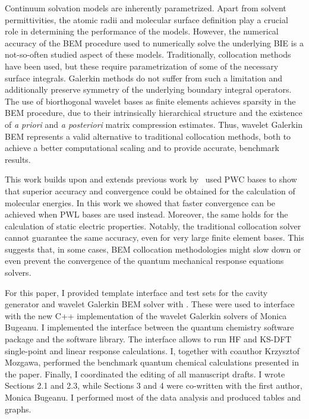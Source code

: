 Continuum solvation models are inherently parametrized. Apart from solvent permittivities,
the atomic radii and molecular surface definition play a crucial role
in determining the performance of the models.
However, the numerical accuracy of the \acs{BEM} procedure used to numerically solve the
underlying \acs{BIE} is a not-so-often studied aspect of these models.
Traditionally, collocation methods have been used, but these require parametrization of some of the necessary surface integrals.
Galerkin methods do not suffer from such a limitation and additionally preserve symmetry of the underlying
boundary integral operators.
The use of biorthogonal wavelet bases as finite elements achieves sparsity in
the \acs{BEM} procedure, due to their intrinsically hierarchical structure and
the existence of \emph{a priori} and \emph{a posteriori} matrix compression
estimates.
Thus, wavelet Galerkin \acs{BEM} represents a valid alternative to traditional collocation methods,
both to achieve a better computational scaling and to provide accurate, benchmark results.

This work builds upon and extends previous work by~\citeauthor{Weijo2010-hy}
\citeauthor{Weijo2010-hy} used \ac{PWC} bases to show that superior accuracy
and convergence could be obtained for the calculation of molecular energies.
In this work we showed that faster convergence can be achieved when \ac{PWL} bases are used instead.
Moreover, the same holds for the calculation of static electric properties.
Notably, the traditional collocation solver cannot guarantee the same accuracy,
even for very large finite element bases. This suggests that, in some cases,
\acs{BEM} collocation methodologies might slow down or even prevent the
convergence of the quantum mechanical response equations solvers.

For this paper, I provided template interface and test sets for the cavity
generator\autocite{Harbrecht2009-no, Harbrecht2011-dk}
and wavelet Galerkin \acs{BEM} solver\autocite{Harbrecht2004-uo, Harbrecht2006-ug, Dahmen2006-pj}
with \pcmsolver.
These were used to interface with the new C++ implementation of the wavelet
Galerkin solvers of Monica Bugeanu.
I implemented the interface between the \LSDALTON quantum chemistry software
package and the \pcmsolver software library. The interface allows to run \acs{HF} and
\acs{KS}-\acs{DFT} single-point and linear response calculations.
I, together with coauthor Krzysztof Mozgawa, performed the benchmark quantum
chemical calculations presented in the paper.
Finally, I coordinated the editing of all manuscript drafts. I wrote Sections 2.1 and 2.3,
while Sections 3 and 4 were co-written with the first author, Monica Bugeanu.
I performed most of the data analysis and produced tables and graphs.

